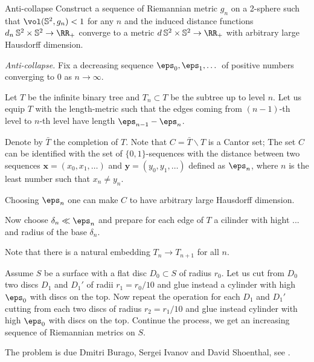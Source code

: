 \begin{pr}{}{Anti-collapse}\label{anti-collaps} Construct
a sequence of Riemannian metric $g_n$ on a 2-sphere such that 
$\vol (\mathbb S^2,g_n)<1$ for any $n$ 
and the induced distance functions $d_n\:\mathbb{S}^2\times \mathbb{S}^2\to \RR_+$
converge to a metric $d\:\mathbb{S}^2\times \mathbb{S}^2\to \RR_+$ 
with arbitrary large Hausdorff dimension.
\end{pr}

\textit{Anti-collapse.}
Fix a decreasing sequence $\eps_0,\eps_1,\dots$ of positive numbers converging to $0$ as $n\to \infty$.

Let $T$ be the infinite binary tree
and $T_n\subset T$ be the subtree up to level $n$.
Let us equip $T$ with the length-metric such that the edges coming from $(n-1)$-th level to $n$-th level have length $\eps_{n-1}-\eps_n$.

Denote by $\bar T$ the completion of $T$.
Note that $C=\bar T\backslash T$ is a Cantor set;
The set $C$ can be identified with the set of $\{0,1\}$-sequences 
with the distance between two sequences $\bm{x}=(x_0,x_1,\dots)$ and $\bm{y}=(y_0,y_1,\dots)$ defined as $\eps_n$, where $n$ is the least number such that $x_n\ne y_n$.

Choosing $\eps_n$ one can make $C$ to have arbitrary large Hausdorff dimension.

Now choose $\delta_n\ll\eps_n$ and prepare for each edge of $T$ a cilinder with hight ... and radius of the base $\delta_n$.
 

Note that there is a natural embedding $T_{n}\to T_{n+1}$ for all $n$.


Assume $S$ be a surface with a flat disc $D_0\subset S$ of radius $r_0$.
Let us cut from $D_0$ two discs $D_1$ and $D_1'$ 
of radii $r_1=r_0/10$ and glue instead a cylinder with high $\eps_0$ 
with discs on the top.
Now repeat the operation for each $D_1$ and $D_1'$ cutting 
from each two discs of radius $r_2=r_1/10$
and glue instead cylinder with high $\eps_0$ 
with discs on the top.
Continue the process, we get an increasing sequence of Riemannian metrics on $S$.

The problem is due
Dmitri Burago, 
Sergei Ivanov 
and David Shoenthal,
see \cite{BIS}.















